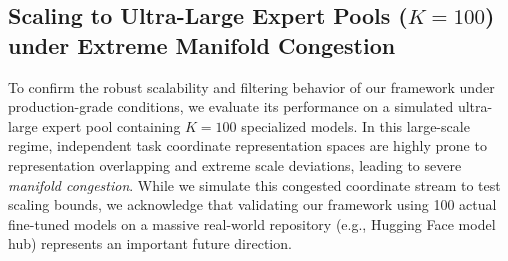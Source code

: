 \begin{table}[h]
\caption{Sensitivity of PFSR + MBH joint mean accuracy (\%) to the routing Softmax temperature parameter $\tau$ under homogeneous ($B=256$) and heterogeneous ($B=256$) deployment streams.}
\label{tab:temperature_sensitivity}
\vskip 0.1in
\begin{center}
\begin{small}
\end{small}
\end{center}
\vskip -0.1in
\end{table}

\subsection{Scaling to Ultra-Large Expert Pools ($K = 100$) under Extreme Manifold Congestion}
To confirm the robust scalability and filtering behavior of our framework under production-grade conditions, we evaluate its performance on a simulated ultra-large expert pool containing $K=100$ specialized models. In this large-scale regime, independent task coordinate representation spaces are highly prone to representation overlapping and extreme scale deviations, leading to severe \emph{manifold congestion}. While we simulate this congested coordinate stream to test scaling bounds, we acknowledge that validating our framework using 100 actual fine-tuned models on a massive real-world repository (e.g., Hugging Face model hub) represents an important future direction.

